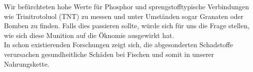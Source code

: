 Wir befürchteten hohe Werte für Phosphor und sprengstofftypische Verbindungen wie Trinitrotoluol (TNT) 
zu messen und unter Umständen sogar Granaten oder Bomben zu finden. Falls dies passieren sollte, würde 
sich für uns die Frage stellen, wie sich diese Munition auf die Öknomie ausgewirkt hat. \\

In schon existierenden Forschungen zeigt sich, die abgesonderten Schadstoffe verursachen gesundheitliche Schäden bei Fischen 
und somit in unserer Nahrungskette. 
%
%
%

